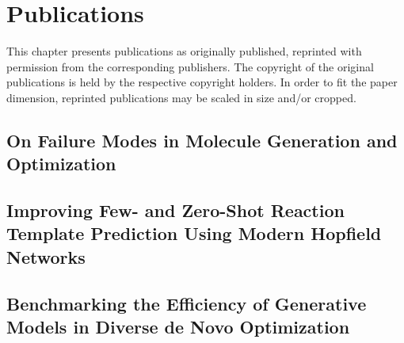 \def\skippdf{1}

\chapter{Publications\label{chap:publications}}
This chapter presents publications as originally published, reprinted with permission
from the corresponding publishers. The copyright of the original publications is held
by the respective copyright holders. In order to fit the paper dimension, reprinted
publications may be scaled in size and/or cropped.

\clearpage
\thispagestyle{plain}
\section{On Failure Modes in Molecule Generation and Optimization\label{sec:failure-modes}}

\ifx\skippdf\undefined
    
    
\fi

\clearpage
\thispagestyle{plain}
\section{Improving Few- and Zero-Shot Reaction Template Prediction Using
  Modern Hopﬁeld Networks\label{sec:mhn-react}}

\ifx\skippdf\undefined
    

    
\fi

\clearpage
\thispagestyle{plain}
\section{Benchmarking the Efficiency of Generative Models in Diverse de
  Novo Optimization\label{sec:diverse-efficiency}}